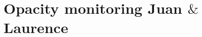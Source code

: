 
\section{Opacity monitoring {\color{YellowGreen} Juan $\&$ Laurence}}
\label{se:opacity_measures}





